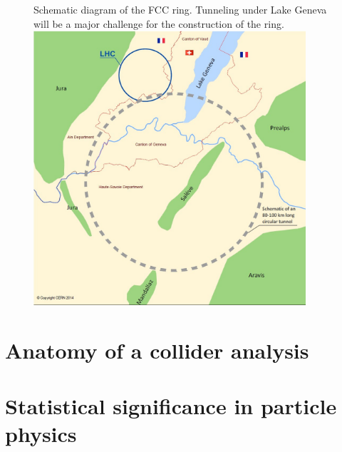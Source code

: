 \begin{figure}[h]
  \begin{sidecaption}
    {Schematic diagram of the FCC ring. Tunneling under Lake Geneva will be a major challenge for the construction of the ring.}
    \centering
  \includegraphics[width=0.9\textwidth]{images/FCC_ring_schematic}
  \end{sidecaption}
\end{figure}
\section{Anatomy of a collider analysis}
\section{Statistical significance in particle physics}
